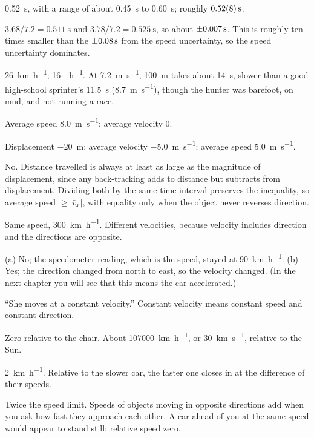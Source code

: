 \documentclass[11pt,twoside,openany]{book}
\begin{document}
\begin{description}[leftmargin=2.6em,itemsep=3pt,style=sameline]
  \item[1.26] \SI{0.52}{\second}, with a range of about \SI{0.45}{\second} to \SI{0.60}{\second}; roughly $\SI{0.52 \pm 0.08}{\second}$.
  \item[1.27] $3.68/7.2 = \SI{0.511}{\second}$ and $3.78/7.2 = \SI{0.525}{\second}$, so about $\SI{\pm 0.007}{\second}$. This is roughly ten times smaller than the $\SI{\pm 0.08}{\second}$ from the speed uncertainty, so the speed uncertainty dominates.
  \item[1.28] \SI{26}{\kilo\metre\per\hour}; \SI{16}{\mile\per\hour}. At \SI{7.2}{\metre\per\second}, \SI{100}{\metre} takes about \SI{14}{\second}, slower than a good high-school sprinter's \SI{11.5}{\second} (\SI{8.7}{\metre\per\second}), though the hunter was barefoot, on mud, and not running a race.
  \item[1.29] Average speed \SI{8.0}{\metre\per\second}; average velocity \num{0}.
  \item[1.30] Displacement \SI{-20}{\metre}; average velocity \SI{-5.0}{\metre\per\second}; average speed \SI{5.0}{\metre\per\second}.
  \item[1.31] No. Distance travelled is always at least as large as the magnitude of displacement, since any back-tracking adds to distance but subtracts from displacement. Dividing both by the same time interval preserves the inequality, so average speed $\ge |\bar v_x|$, with equality only when the object never reverses direction.
  \item[1.32] Same speed, \SI{300}{\kilo\metre\per\hour}. Different velocities, because velocity includes direction and the directions are opposite.
  \item[1.33] (a) No; the speedometer reading, which is the speed, stayed at \SI{90}{\kilo\metre\per\hour}. (b) Yes; the direction changed from north to east, so the velocity changed. (In the next chapter you will see that this means the car accelerated.)
  \item[1.34] ``She moves at a constant velocity.'' Constant velocity means constant speed and constant direction.
  \item[1.35] Zero relative to the chair. About \SI{107000}{\kilo\metre\per\hour}, or \SI{30}{\kilo\metre\per\second}, relative to the Sun.
  \item[1.36] \SI{2}{\kilo\metre\per\hour}. Relative to the slower car, the faster one closes in at the difference of their speeds.
  \item[1.37] Twice the speed limit. Speeds of objects moving in opposite directions add when you ask how fast they approach each other. A car ahead of you at the same speed would appear to stand still: relative speed zero.

\end{description}
\end{document}

